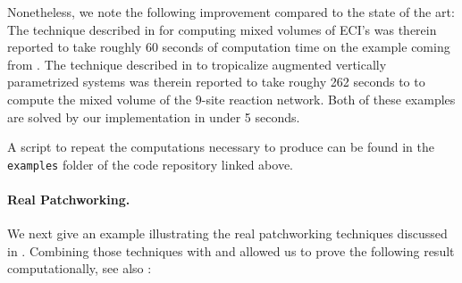 \documentclass[a4paper]{article}
\theoremstyle{remark}
\begin{document}
Nonetheless, we note the following improvement compared to the state
of the art: The technique described in
\cite{helminckTropicalMethodSolving2024} for computing mixed volumes
of ECI's was therein reported to take roughly 60 seconds of
computation time on the example coming from
\cite{grossAlgebraicSystemsBiology2016}. The technique described in
\cite{feliuRootBoundsVertical2026} to tropicalize augmented vertically
parametrized systems was therein reported to take roughy 262 seconds
to to compute the mixed volume of the $9$-site reaction network. Both
of these examples are solved by our implementation in under 5 seconds.

A script to repeat the computations necessary to produce
 can be found in the \texttt{examples} folder of
the code repository linked above.


\paragraph*{Real Patchworking.}

We next give an example illustrating the real patchworking techniques
discussed in . Combining those techniques with
 and  allowed us to prove the following
result computationally, see also :
\end{document}
